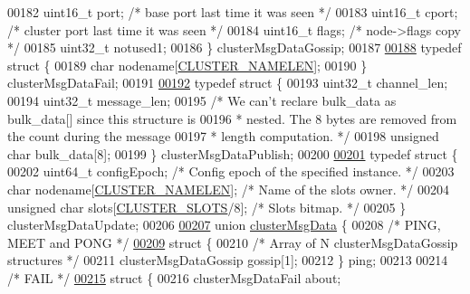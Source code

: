\begin{DoxyCode}
00182     uint16\_t port;              \textcolor{comment}{/* base port last time it was seen */}
00183     uint16\_t cport;             \textcolor{comment}{/* cluster port last time it was seen */}
00184     uint16\_t flags;             \textcolor{comment}{/* node->flags copy */}
00185     uint32\_t notused1;
00186 \} clusterMsgDataGossip;
00187 
\hyperlink{structclusterMsgDataFail}{00188} \textcolor{keyword}{typedef} \textcolor{keyword}{struct} \{
00189     \textcolor{keywordtype}{char} nodename[\hyperlink{cluster_8h_ace7a882972eff7149675252938643b6e}{CLUSTER\_NAMELEN}];
00190 \} clusterMsgDataFail;
00191 
\hyperlink{structclusterMsgDataPublish}{00192} \textcolor{keyword}{typedef} \textcolor{keyword}{struct} \{
00193     uint32\_t channel\_len;
00194     uint32\_t message\_len;
00195     \textcolor{comment}{/* We can't reclare bulk\_data as bulk\_data[] since this structure is}
00196 \textcolor{comment}{     * nested. The 8 bytes are removed from the count during the message}
00197 \textcolor{comment}{     * length computation. */}
00198     \textcolor{keywordtype}{unsigned} \textcolor{keywordtype}{char} bulk\_data[8];
00199 \} clusterMsgDataPublish;
00200 
\hyperlink{structclusterMsgDataUpdate}{00201} \textcolor{keyword}{typedef} \textcolor{keyword}{struct} \{
00202     uint64\_t configEpoch; \textcolor{comment}{/* Config epoch of the specified instance. */}
00203     \textcolor{keywordtype}{char} nodename[\hyperlink{cluster_8h_ace7a882972eff7149675252938643b6e}{CLUSTER\_NAMELEN}]; \textcolor{comment}{/* Name of the slots owner. */}
00204     \textcolor{keywordtype}{unsigned} \textcolor{keywordtype}{char} slots[\hyperlink{cluster_8h_aa3e2cb951eebb16725ecc3f5beefd9fd}{CLUSTER\_SLOTS}/8]; \textcolor{comment}{/* Slots bitmap. */}
00205 \} clusterMsgDataUpdate;
00206 
\hyperlink{unionclusterMsgData}{00207} \textcolor{keyword}{union} \hyperlink{unionclusterMsgData}{clusterMsgData} \{
00208     \textcolor{comment}{/* PING, MEET and PONG */}
\hyperlink{structclusterMsgData_8ping}{00209}     \textcolor{keyword}{struct} \{
00210         \textcolor{comment}{/* Array of N clusterMsgDataGossip structures */}
00211         clusterMsgDataGossip gossip[1];
00212     \} ping;
00213 
00214     \textcolor{comment}{/* FAIL */}
\hyperlink{structclusterMsgData_8fail}{00215}     \textcolor{keyword}{struct} \{
00216         clusterMsgDataFail about;

\end{DoxyCode}
